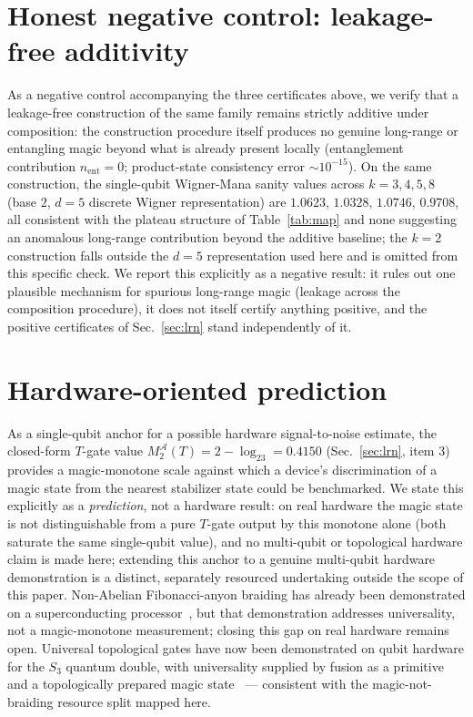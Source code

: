 \documentclass[aps,pra,twocolumn,superscriptaddress,longbibliography,floatfix,nofootinbib]{revtex4-2}
\begin{document}
\section{Honest negative control: leakage-free additivity}
\label{sec:n1}

As a negative control accompanying the three certificates above, we
verify that a leakage-free construction of the same family remains
strictly additive under composition: the construction procedure
itself produces no genuine long-range or entangling magic
beyond what is already present locally (entanglement contribution
$n_{\mathrm{ent}}=0$; product-state consistency error
$\sim10^{-15}$). On the same construction, the single-qubit Wigner-Mana
sanity values across $k=3,4,5,8$ (base $2$, $d=5$ discrete Wigner
representation) are $1.0623,\,1.0328,\,1.0746,\,0.9708$, all consistent
with the plateau structure of Table~\ref{tab:map} and none suggesting
an anomalous long-range contribution beyond the additive baseline;
the $k=2$ construction falls outside the $d=5$ representation used
here and is omitted from this specific check. We report this
explicitly as a negative result: it rules out one plausible mechanism
for spurious long-range magic (leakage across the composition
procedure), it does not itself certify anything positive, and the
positive certificates of Sec.~\ref{sec:lrn} stand independently of
it.

\section{Hardware-oriented prediction}
\label{sec:hw}

As a single-qubit anchor for a possible hardware signal-to-noise
estimate, the closed-form $T$-gate value
$M_2^{\mathcal A}(T)=2-\log_23=0.4150$ (Sec.~\ref{sec:lrn}, item 3)
provides a magic-monotone scale against which a device's discrimination
of a magic state from the nearest stabilizer state could be
benchmarked. We state this explicitly as a \emph{prediction}, not a
hardware result: on real hardware the magic state is not
distinguishable from a pure $T$-gate output by this monotone alone
(both saturate the same single-qubit value), and no multi-qubit or
topological hardware claim is made here; extending this anchor to a
genuine multi-qubit hardware demonstration is a distinct, separately
resourced undertaking outside the scope of this paper. Non-Abelian
Fibonacci-anyon braiding has already been demonstrated on a
superconducting processor~\cite{Xu2024magic}, but that demonstration
addresses universality, not a magic-monotone measurement; closing
this gap on real hardware remains open. Universal topological gates
have now been demonstrated on qubit hardware for the $S_3$
quantum double, with universality supplied by fusion as a primitive
and a topologically prepared magic state~\cite{Lo2026} --- consistent
with the magic-not-braiding resource split mapped here.
\end{document}

